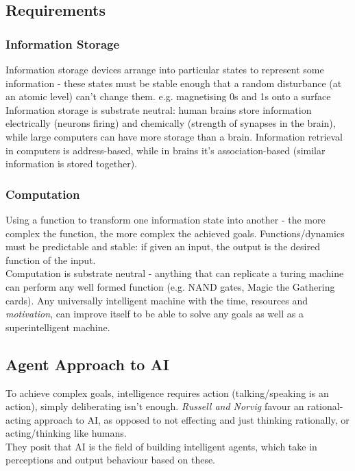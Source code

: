 \subsection{Requirements}

\subsubsection{Information Storage}
Information storage devices arrange into particular states to represent some information - these states must be stable enough that a random disturbance (at an atomic level) can't change them. e.g. magnetising 0s and 1s onto a surface\\

Information storage is substrate neutral: human brains store information electrically (neurons firing) and chemically (strength of synapses in the brain), while large computers can have more storage than a brain. Information retrieval in computers is address-based, while in brains it's association-based (similar information is stored together).

\subsubsection{Computation}
Using a function to transform one information state into another - the more complex the function, the more complex the achieved goals. Functions/dynamics must be predictable and stable: if given an input, the output is the desired function of the input.\\

Computation is substrate neutral - anything that can replicate a turing machine can perform any well formed function (e.g. NAND gates, Magic the Gathering cards). Any universally intelligent machine with the time, resources and \emph{motivation}, can improve itself to be able to solve any goals as well as a superintelligent machine. 

\subsection{Agent Approach to AI}
To achieve complex goals, intelligence requires action (talking/speaking is an action), simply deliberating isn't enough. \emph{Russell and Norvig} favour an rational-acting approach to AI, as opposed to not effecting and just thinking rationally, or acting/thinking like humans. \\

They posit that AI is the field of building intelligent agents, which take in perceptions and output behaviour based on these.

